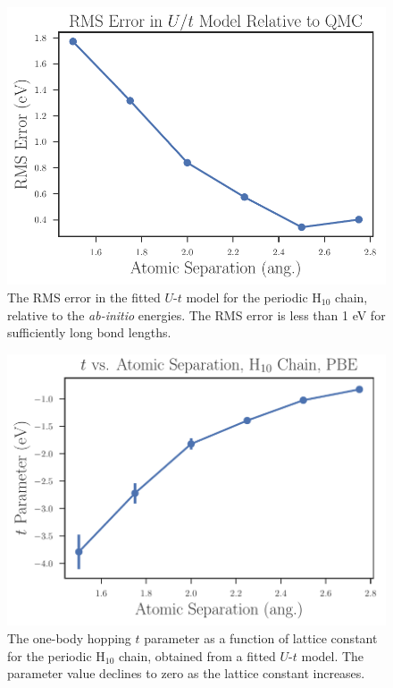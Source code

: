  \begin{figure}
\centering
\includegraphics[scale=0.6]{./Figures/rms_ut_error_vs_separation_h_chain.pdf}
\caption{The RMS error in the fitted $U$-$t$ model for the periodic H$_{10}$ chain, relative to the \textit{ab-initio} energies. The RMS error is less than 1 eV for sufficiently long bond lengths.}\label{fig:RMS-Error-vs-Bond}
 \end{figure}
 
 \begin{figure}
\centering
\includegraphics[scale=0.6]{./Figures/$t$_vs_separation_h_chain_ols.pdf}
\caption{The one-body hopping $t$ parameter as a function of lattice constant for the periodic H$_{10}$ chain, obtained from a fitted $U$-$t$ model. The parameter value declines to zero as the lattice constant increases.}\label{fig:Parameters-vs-Bond-t}
 \end{figure}
